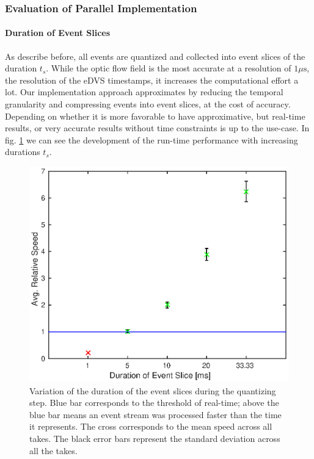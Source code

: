 \subsubsection{Evaluation of Parallel Implementation}
\paragraph{Duration of Event Slices}
As describe before, all events are quantized and collected into event slices of the duration $t_s$.
While the optic flow field is the most accurate at a resolution of $1\mu\mathrm{s}$, the resolution of the eDVS timestamps, it increases the computational effort a lot.
Our implementation approach approximates by reducing the temporal granularity and compressing events into event slices, at the cost of accuracy.
Depending on whether it is more favorable to have approximative, but real-time results, or very accurate results without time constraints is up to the use-case.
In fig. \ref{fig:gpu_tsd} we can see the development of the run-time performance with increasing durations $t_s$.
\begin{figure}[!htb]
	\centering
	\includegraphics[scale=.9]{gpu_tsd.eps}
	\caption{Variation of the duration of the event slices during the quantizing step. Blue bar corresponds to the threshold of real-time; above the blue bar means an event stream was processed faster than the time it represents. The cross corresponds to the mean speed across all takes. The black error bars represent the standard deviation across all the takes.}
	\label{fig:gpu_tsd}
\end{figure}
